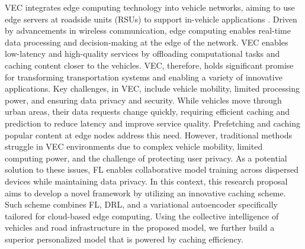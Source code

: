 \documentclass[journal]{IEEEtran}
\begin{document}
VEC integrates edge computing technology into vehicle networks, aiming to use edge servers at roadside units (RSUs) to support in-vehicle applications \cite{r2_vanet}. Driven by advancements in wireless communication, edge computing enables real-time data processing and decision-making at the edge of the network. VEC enables low-latency and high-quality services by offloading computational tasks and caching content closer to the vehicles. VEC, therefore, holds significant promise for transforming transportation systems and enabling a variety of innovative applications. 
Key challenges, in VEC, include vehicle mobility, limited processing power, and ensuring data privacy and security.
While vehicles move through urban areas, their data requests change quickly, requiring efficient caching and prediction to reduce latency and improve service quality. Prefetching and caching popular content at edge nodes address this need. However, traditional methods struggle in VEC environments due to complex vehicle mobility, limited computing power, and the challenge of protecting user privacy. 
As a potential solution to these issues, FL enables collaborative model training across dispersed devices while maintaining data privacy. In this context, this research proposal aims to develop a novel framework by utilizing an innovative caching scheme. Such scheme combines FL, DRL, and a variational autoencoder specifically tailored for cloud-based edge computing. Using the collective intelligence of vehicles and road infrastructure in the proposed model, we further build a superior personalized model that is powered by caching efficiency.
\end{document}
